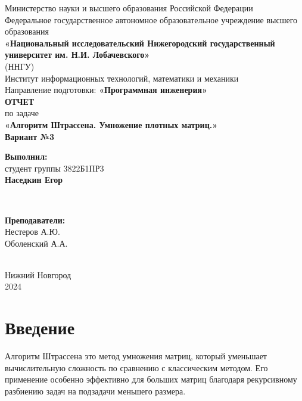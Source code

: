 \documentclass[a4paper,12pt]{article}
\begin{document}
\begin{titlepage}
    \centering
    \large
    Министерство науки и высшего образования Российской Федерации\\[0.5cm]
    Федеральное государственное автономное образовательное учреждение высшего образования\\[0.5cm]
    \textbf{«Национальный исследовательский Нижегородский государственный университет им. Н.И. Лобачевского»}\\
    (ННГУ)\\[1cm]
    Институт информационных технологий, математики и механики\\[0.5cm]
    Направление подготовки: \textbf{«Программная инженерия»}\\[2cm]

    \vfill %
    {\LARGE \textbf{ОТЧЕТ}}\\[0.5cm]
    {\Large по задаче}\\[0.5cm]
    {\LARGE \textbf{«Алгоритм Штрассена. Умножение плотных матриц.»}}\\[0.5cm]
    {\Large \textbf{Вариант №3}}\\[2.5cm]

    \hfill\parbox{0.5\textwidth}{
        \textbf{Выполнил:} \\
        студент группы 3822Б1ПР3 \\
        \textbf{Наседкин Егор}
    }\\[0.5cm]

    \hfill\parbox{0.5\textwidth}{
        \textbf{Преподаватели:} \\
        Нестеров А.Ю.\\
        Оболенский А.А.

    }\\[2cm]

    Нижний Новгород\\
    2024
\end{titlepage}

\tableofcontents
\newpage

\section{Введение}

\hspace*{1.25em}Алгоритм Штрассена это метод умножения матриц, который уменьшает вычислительную сложность по сравнению с классическим методом. Его применение особенно эффективно для больших матриц благодаря рекурсивному разбиению задач на подзадачи меньшего размера.
\end{document}
